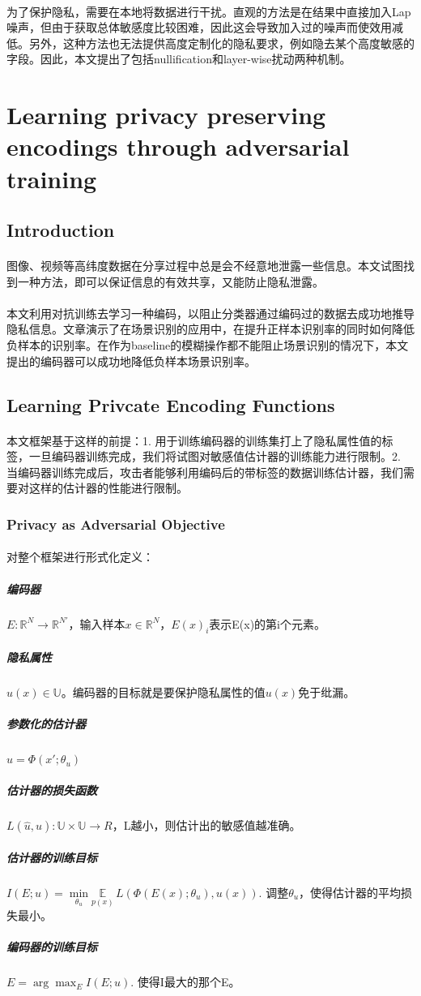 \documentclass[12pt,a4paper]{article}
\begin{document}
\paragraph{} 为了保护隐私，需要在本地将数据进行干扰。直观的方法是在结果中直接加入Lap噪声，但由于获取总体敏感度比较困难，因此这会导致加入过的噪声而使效用减低。另外，这种方法也无法提供高度定制化的隐私要求，例如隐去某个高度敏感的字段。因此，本文提出了包括nullification和layer-wise扰动两种机制。

\section{Learning privacy preserving encodings through adversarial training\cite{pittaluga2019learning}}
\subsection{Introduction}
\paragraph{} 图像、视频等高纬度数据在分享过程中总是会不经意地泄露一些信息。本文试图找到一种方法，即可以保证信息的有效共享，又能防止隐私泄露。
\paragraph{} 本文利用对抗训练去学习一种编码，以阻止分类器通过编码过的数据去成功地推导隐私信息。文章演示了在场景识别的应用中，在提升正样本识别率的同时如何降低负样本的识别率。在作为baseline的模糊操作都不能阻止场景识别的情况下，本文提出的编码器可以成功地降低负样本场景识别率。
\subsection{Learning Privcate Encoding Functions}
\paragraph{} 本文框架基于这样的前提：1. 用于训练编码器的训练集打上了隐私属性值的标签，一旦编码器训练完成，我们将试图对敏感值估计器的训练能力进行限制。2. 当编码器训练完成后，攻击者能够利用编码后的带标签的数据训练估计器，我们需要对这样的估计器的性能进行限制。
\subsubsection{Privacy as Adversarial Objective}
\paragraph{}对整个框架进行形式化定义：
	\subparagraph{编码器} $E: \mathbb{R}^N \rightarrow \mathbb{R}^{N'}$，输入样本$x \in \mathbb{R}^N$，$E(x)_i$表示E(x)的第i个元素。
	\subparagraph{隐私属性} $u(x) \in \mathbb{U}$。编码器的目标就是要保护隐私属性的值$u(x)$免于纰漏。
	\subparagraph{参数化的估计器} $\hat u = \Phi(x';\theta_u)$
	\subparagraph{估计器的损失函数} $L(\hat u, u): \mathbb{U} \times \mathbb{U} \rightarrow R$，L越小，则估计出的敏感值越准确。
	\subparagraph{估计器的训练目标} $I(E;u) = \underset{\theta_u}{\min}\underset{p(x)}{\mathbb{E}}\,L(\Phi(E(x);\theta_u),u(x))$. 调整$\theta_u$，使得估计器的平均损失最小。  
	\subparagraph{编码器的训练目标} $E = \arg\max_E I(E;u)$. 使得I最大的那个E。
\end{document}
